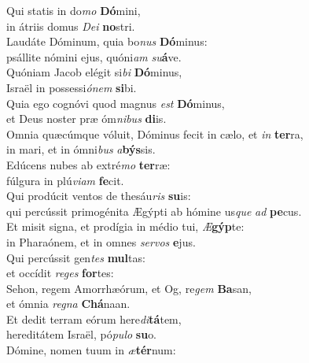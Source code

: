 \evenverse Qui statis in do\textit{mo} \textbf{Dó}mini,~\*\\
\evenverse in átriis domus \textit{De}\textit{i} \textbf{no}stri.\\
\oddverse Laudáte Dóminum, quia bo\textit{nus} \textbf{Dó}minus:~\*\\
\oddverse psállite nómini ejus, quóni\textit{am} \textit{su}\textbf{á}ve.\\
\evenverse Quóniam Jacob elégit si\textit{bi} \textbf{Dó}minus,~\*\\
\evenverse Israël in possessi\textit{ó}\textit{nem} \textbf{si}bi.\\
\oddverse Quia ego cognóvi quod magnus \textit{est} \textbf{Dó}minus,~\*\\
\oddverse et Deus noster præ óm\textit{ni}\textit{bus} \textbf{di}is.\\
\evenverse Omnia quæcúmque vóluit, Dóminus fecit in cælo, et \textit{in} \textbf{ter}ra,~\*\\
\evenverse in mari, et in ómni\textit{bus} \textit{a}\textbf{býs}sis.\\
\oddverse Edúcens nubes ab extré\textit{mo} \textbf{ter}ræ:~\*\\
\oddverse fúlgura in plú\textit{vi}\textit{am} \textbf{fe}cit.\\
\evenverse Qui prodúcit ventos de thesáu\textit{ris} \textbf{su}is:~\*\\
\evenverse qui percússit primogénita Ægýpti ab hómine us\textit{que} \textit{ad} \textbf{pe}cus.\\
\oddverse Et misit signa, et prodígia in médio tui, \textit{Æ}\textbf{gýp}te:~\*\\
\oddverse in Pharaónem, et in omnes \textit{ser}\textit{vos} \textbf{e}jus.\\
\evenverse Qui percússit gen\textit{tes} \textbf{mul}tas:~\*\\
\evenverse et occídit \textit{re}\textit{ges} \textbf{for}tes:\\
\oddverse Sehon, regem Amorrhæórum, et Og, re\textit{gem} \textbf{Ba}san,~\*\\
\oddverse et ómnia \textit{re}\textit{gna} \textbf{Chá}naan.\\
\evenverse Et dedit terram eórum here\textit{di}\textbf{tá}tem,~\*\\
\evenverse hereditátem Israël, pó\textit{pu}\textit{lo} \textbf{su}o.\\
\oddverse Dómine, nomen tuum in \textit{æ}\textbf{tér}num:~\*\\
